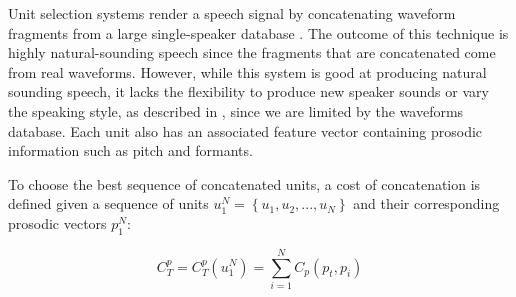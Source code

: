 Unit selection systems render a speech signal by concatenating waveform fragments from a large single-speaker database \cite{hunt1996unit}. The outcome of this technique is highly natural-sounding speech since the fragments that are concatenated come from real waveforms. However, while this system is good at producing natural sounding speech, it lacks the flexibility to produce new speaker sounds or vary the speaking style, as described in \cite{jauk2015creating}, since we are limited by the waveforms database. Each unit also has an associated feature vector containing prosodic information such as pitch and formants.

To choose the best sequence of concatenated units, a cost of concatenation is defined \cite{unit-cost} given a sequence of units $u_1^N = \left \{ u_1, u_2, ..., u_N \right \}$ and their corresponding prosodic vectors $p_1^N$:

\begin{equation}
    C_T^p = C_T^p (u_1^N) = \sum_{i = 1}^{N} C_p (p_t, p_i) 
    \label{eq:pros-cost}
\end{equation}

